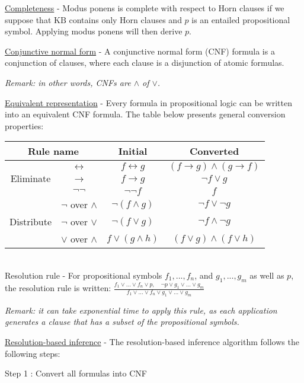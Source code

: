 \documentclass[4pt,landscape]{article}
\begin{document}
\begin{multicols*}{4}
 \columnbreak
 {\tiny \underline{Completeness} - Modus ponens is complete with respect to Horn clauses if we suppose that $\textrm{KB}$ contains only Horn clauses and $p$ is an entailed propositional symbol. Applying modus ponens will then derive $p$.}\par
 {\tiny \underline{Conjunctive normal form} - A conjunctive normal form (CNF) formula is a conjunction of clauses, where each clause is a disjunction of atomic formulas.}\par
 {\tiny \textit{Remark: in other words, CNFs are $\wedge$ of $\vee$.}}\par
 {\tiny \underline{Equivalent representation} - Every formula in propositional logic can be written into an equivalent CNF formula. The table below presents general conversion properties:}\par
 \begin{tabular}{c | c | c | c}
 \hline
 \multicolumn{2}{c}{Rule name}& Initial&Converted\\
 \hline
 \multirow{3}{*}{Eliminate}&\tiny $\leftrightarrow$&\tiny $f \leftrightarrow g$&\tiny $(f \rightarrow g) \wedge (g \rightarrow f)$\\
 &\tiny $\rightarrow$&\tiny $f \rightarrow g$&\tiny $\neg f \vee g$\\
 &\tiny $\neg\neg$&\tiny $\neg\neg f$&\tiny $f$\\
 \hline
 \multirow{3}{*}{Distribute}&\tiny $\neg$ over $\wedge$&\tiny $\neg(f \wedge g)$&\tiny $\neg f \vee \neg g$\\
 &\tiny $\neg$ over $\vee$&\tiny $\neg(f \vee g)$&\tiny $\neg f\wedge \neg g$\\
 &\tiny $\vee$ over $\wedge$&\tiny $f \vee (g \wedge h)$&\tiny $(f \vee g) \wedge (f \vee h)$\\
 \hline
 \end{tabular}\\
 {\tiny Resolution rule - For propositional symbols $f_1,...,f_n$, and $g_1,...,g_m$ as well as $p$, the resolution rule is written: $\frac{f_1\vee...\vee f_n\vee p,\quad\neg p\vee g_1\vee...\vee g_m}{f_1\vee...\vee f_n\vee g_1\vee...\vee g_m}$}\par
 {\tiny \textit{Remark: it can take exponential time to apply this rule, as each application generates a clause that has a subset of the propositional symbols.}}\par
 {\tiny \underline{Resolution-based inference} - The resolution-based inference algorithm follows the following steps:}\par
 {\textrm{Step 1} : Convert all formulas into CNF}\par

\end{multicols*}
\end{document}
